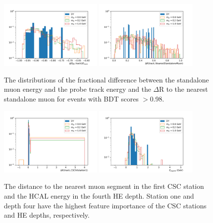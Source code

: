 \begin{figure}[htbp]
	\centering
	\includegraphics[width=0.45\textwidth]{figures/partDisStaDE.pdf}
	\hspace{0.01\textwidth}
	\includegraphics[width=0.45\textwidth]{figures/partDisStaDr.pdf}
	\caption[Expected Partial Disappearance Standalone Muon Features]{The distributions of the fractional difference between the standalone muon energy and the probe track energy and the $\Delta$R to the nearest standalone muon for events with BDT scores $>$0.98.}
	\label{fig:partSta}
\end{figure}

\begin{figure}[htbp]
	\centering
	\includegraphics[width=0.45\textwidth]{figures/partDisCSCdr_one.pdf}
	\hspace{0.01\textwidth}
	\includegraphics[width=0.45\textwidth]{figures/partDisHCALE_four.pdf}
	\caption[Expected Partial Disappearance CSC and HCAL Features]{The distance to the nearest muon segment in the first CSC station and the HCAL energy in the fourth HE depth. Station one and depth four have the highest feature importance of the CSC stations and HE depths, respectively.}
	\label{fig:partStat}
\end{figure}

